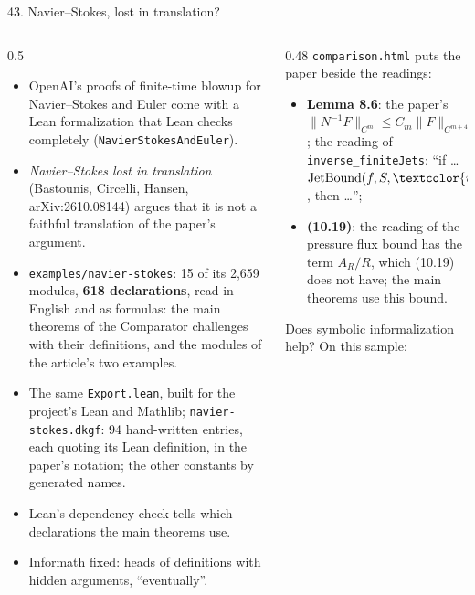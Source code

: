 \documentclass[10pt,aspectratio=169]{beamer}
\newcommand{\bad}[1]{\textcolor{warn}{#1}}
\begin{document}
\begin{frame}{43. Navier--Stokes, lost in translation?}
  \scriptsize
  \begin{columns}[T]
    \begin{column}{0.5\textwidth}
      \begin{itemize}
        \item OpenAI's proofs of finite-time blowup for Navier--Stokes and Euler come with a
              Lean formalization that Lean checks completely (\texttt{NavierStokesAndEuler}).
        \item \emph{Navier--Stokes lost in translation} (Bastounis, Circelli, Hansen,
              arXiv:2610.08144) argues that it is not a faithful translation of the paper's
              argument.
        \item \texttt{examples/navier-stokes}: 15 of its 2,659 modules, \textbf{618
              declarations}, read in English and as formulas: the main theorems of the
              Comparator challenges with their definitions, and the modules of the article's
              two examples.
        \item The same \texttt{Export.lean}, built for the project's Lean and Mathlib;
              \texttt{navier-stokes.dkgf}: 94 hand-written entries, each quoting its Lean
              definition, in the paper's notation; the other constants by generated names.
        \item Lean's dependency check tells which declarations the main theorems use.
        \item Informath fixed: heads of definitions with hidden arguments, ``eventually''.
      \end{itemize}
    \end{column}
    \begin{column}{0.48\textwidth}
      \texttt{comparison.html} puts the paper beside the readings:
      \begin{itemize}
        \item \textbf{Lemma 8.6}: the paper's $\|N^{-1}F\|_{C^m} \leq C_m \|F\|_{C^{m+4}}$; the
              reading of \texttt{inverse\_finiteJets}: ``if \ldots\ $\mathrm{JetBound}(f, S,
              \bad{n + 5}, C)$, then \ldots'';
        \item \textbf{(10.19)}: the reading of the pressure flux bound has the term
              \bad{$A_R/R$}, which (10.19) does not have; the main theorems use this bound.
      \end{itemize}
      Does symbolic informalization help? On this sample:

\end{column}
\end{columns}
\end{frame}
\end{document}
